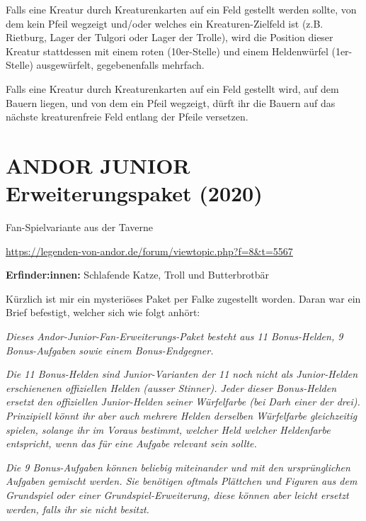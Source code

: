 {Falls eine Kreatur durch Kreaturenkarten auf ein Feld gestellt werden sollte, von dem kein Pfeil wegzeigt und/oder welches ein Kreaturen-Zielfeld ist (z.B. Rietburg, Lager der Tulgori oder Lager der Trolle), wird die Position dieser Kreatur stattdessen mit einem roten (10er-Stelle) und einem Heldenwürfel (1er-Stelle) ausgewürfelt, gegebenenfalls mehrfach.

Falls eine Kreatur durch Kreaturenkarten auf ein Feld gestellt wird, auf dem Bauern liegen, und von dem ein Pfeil wegzeigt, dürft ihr die Bauern auf das nächste kreaturenfreie Feld entlang der Pfeile versetzen.









\newpage
\section{ANDOR JUNIOR Erweiterungspaket (2020)}

\begin{center}
    Fan-Spielvariante aus der Taverne

    \url{https://legenden-von-andor.de/forum/viewtopic.php?f=8&t=5567}
\end{center}


\textbf{Erfinder:innen:} Schlafende Katze, Troll und Butterbrotbär

Kürzlich ist mir ein mysteriöses Paket per Falke zugestellt worden. Daran war ein Brief befestigt, welcher sich wie folgt anhört:

\textit{Dieses Andor-Junior-Fan-Erweiterungs-Paket besteht aus 11 Bonus-Helden, 9 Bonus-Aufgaben sowie einem Bonus-Endgegner.}

\textit{Die 11 Bonus-Helden sind Junior-Varianten der 11 noch nicht als Junior-Helden erschienenen offiziellen Helden (ausser Stinner). Jeder dieser Bonus-Helden ersetzt den offiziellen Junior-Helden seiner Würfelfarbe (bei Darh einer der drei). Prinzipiell könnt ihr aber auch mehrere Helden derselben Würfelfarbe gleichzeitig spielen, solange ihr im Voraus bestimmt, welcher Held welcher Heldenfarbe entspricht, wenn das für eine Aufgabe relevant sein sollte.}

\textit{Die 9 Bonus-Aufgaben können beliebig miteinander und mit den ursprünglichen Aufgaben gemischt werden. Sie benötigen oftmals Plättchen und Figuren aus dem Grundspiel oder einer Grundspiel-Erweiterung, diese können aber leicht ersetzt werden, falls ihr sie nicht besitzt.}

}
